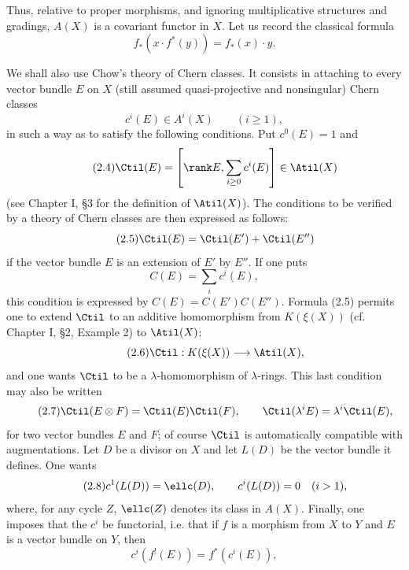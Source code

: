 Thus, relative to proper morphisms, and ignoring multiplicative structures and gradings, $A(X)$ is a covariant functor in $X$. Let us record the classical formula
\begin{equation}\tag{2.3}
 f_*(x\cdot f^*(y))=f_*(x)\cdot y .
\end{equation}

We shall also use Chow's theory of Chern classes. It consists in attaching to every vector bundle $E$ on $X$ (still assumed quasi-projective and nonsingular) Chern classes
\[
 c^i(E)\in A^i(X)\qquad (i\geq 1),
\]
in such a way as to satisfy the following conditions. Put $c^0(E)=1$ and
\begin{equation}\tag{2.4}
 \Ctil(E)=\left[\rank E,\sum_{i\geq 0}c^i(E)\right]\in \Atil(X)
\end{equation}
(see Chapter I, \S 3 for the definition of $\Atil(X)$). The conditions to be verified by a theory of Chern classes are then expressed as follows:
\begin{equation}\tag{2.5}
 \Ctil(E)=\Ctil(E')+\Ctil(E'')
\end{equation}
if the vector bundle $E$ is an extension of $E'$ by $E''$. If one puts
\[
 C(E)=\sum_i c^i(E),
\]
this condition is expressed by $C(E)=C(E')C(E'')$. Formula (2.5) permits one to extend $\Ctil$ to an additive homomorphism from $K(\xi(X))$ (cf. Chapter I, \S 2, Example 2) to $\Atil(X)$:
\begin{equation}\tag{2.6}
 \Ctil:K(\xi(X))\longrightarrow \Atil(X),
\end{equation}
and one wants $\Ctil$ to be a $\lambda$-homomorphism of $\lambda$-rings. This last condition may also be written
\begin{equation}\tag{2.7}
 \Ctil(E\otimes F)=\Ctil(E)\Ctil(F),\qquad
 \Ctil(\lambda^iE)=\lambda^i\Ctil(E),
\end{equation}
for two vector bundles $E$ and $F$; of course $\Ctil$ is automatically compatible with augmentations. Let $D$ be a divisor on $X$ and let $L(D)$ be the vector bundle it defines. One wants
\begin{equation}\tag{2.8}
 c^1(L(D))=\ellc(D),\qquad c^i(L(D))=0\quad (i>1),
\end{equation}
where, for any cycle $Z$, $\ellc(Z)$ denotes its class in $A(X)$. Finally, one imposes that the $c^i$ be functorial, i.e. that if $f$ is a morphism from $X$ to $Y$ and $E$ is a vector bundle on $Y$, then
\begin{equation}\tag{2.9}
 c^i(f^!(E))=f^*(c^i(E)),
\end{equation}

